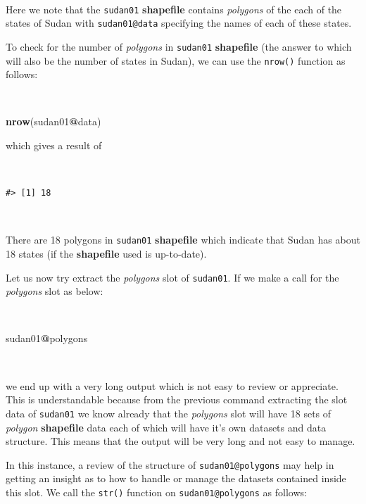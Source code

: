 \documentclass[12pt,a4paper,a4paper]{book}
\newenvironment{Shaded}{\begin{snugshade}}{\end{snugshade}}
\newcommand{\KeywordTok}[1]{\textcolor[rgb]{0.13,0.29,0.53}{\textbf{#1}}}
\newcommand{\OperatorTok}[1]{\textcolor[rgb]{0.81,0.36,0.00}{\textbf{#1}}}
\newcommand{\NormalTok}[1]{#1}
\theoremstyle{definition}
\theoremstyle{definition}
\theoremstyle{definition}
\theoremstyle{remark}
\begin{document}
~

Here we note that the \texttt{sudan01} \textbf{shapefile} contains
\emph{polygons} of the each of the states of Sudan with
\texttt{sudan01@data} specifying the names of each of these states.

To check for the number of \emph{polygons} in \texttt{sudan01}
\textbf{shapefile} (the answer to which will also be the number of
states in Sudan), we can use the \texttt{nrow()} function as follows:

~

\begin{Shaded}
\begin{Highlighting}[]
\KeywordTok{nrow}\NormalTok{(sudan01}\OperatorTok{@}\NormalTok{data)}
\end{Highlighting}
\end{Shaded}

\newpage

which gives a result of

~

\begin{verbatim}
#> [1] 18
\end{verbatim}

~

There are 18 polygons in \texttt{sudan01} \textbf{shapefile} which
indicate that Sudan has about 18 states (if the \textbf{shapefile} used
is up-to-date).

Let us now try extract the \emph{polygons} slot of \texttt{sudan01}. If
we make a call for the \emph{polygons} slot as below:

~

\begin{Shaded}
\begin{Highlighting}[]
\NormalTok{sudan01}\OperatorTok{@}\NormalTok{polygons}
\end{Highlighting}
\end{Shaded}

~

we end up with a very long output which is not easy to review or
appreciate. This is understandable because from the previous command
extracting the slot data of \texttt{sudan01} we know already that the
\emph{polygons} slot will have 18 sets of \emph{polygon}
\textbf{shapefile} data each of which will have it's own datasets and
data structure. This means that the output will be very long and not
easy to manage.

In this instance, a review of the structure of \texttt{sudan01@polygons}
may help in getting an insight as to how to handle or manage the
datasets contained inside this slot. We call the \texttt{str()} function
on \texttt{sudan01@polygons} as follows:
\end{document}
